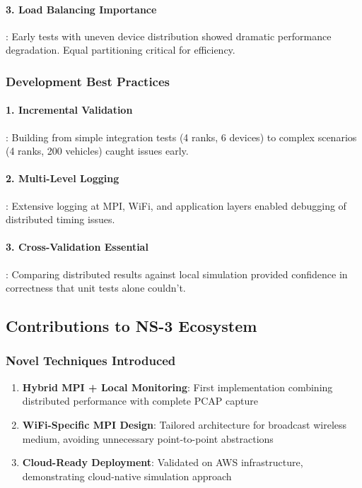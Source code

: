 \paragraph{3. Load Balancing Importance}:
Early tests with uneven device distribution showed dramatic performance degradation. Equal partitioning critical for efficiency.

\subsubsection{Development Best Practices}

\paragraph{1. Incremental Validation}:
Building from simple integration tests (4 ranks, 6 devices) to complex scenarios (4 ranks, 200 vehicles) caught issues early.

\paragraph{2. Multi-Level Logging}:
Extensive logging at MPI, WiFi, and application layers enabled debugging of distributed timing issues.

\paragraph{3. Cross-Validation Essential}:
Comparing distributed results against local simulation provided confidence in correctness that unit tests alone couldn't.

\subsection{Contributions to NS-3 Ecosystem}

\subsubsection{Novel Techniques Introduced}

\begin{enumerate}
    \item \textbf{Hybrid MPI + Local Monitoring}: First implementation combining distributed performance with complete PCAP capture
    
    \item \textbf{WiFi-Specific MPI Design}: Tailored architecture for broadcast wireless medium, avoiding unnecessary point-to-point abstractions
    
    \item \textbf{Cloud-Ready Deployment}: Validated on AWS infrastructure, demonstrating cloud-native simulation approach
\end{enumerate}


